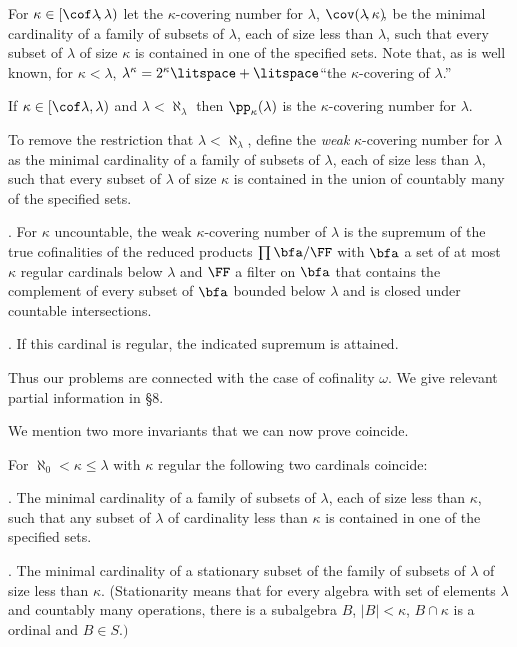 For $\kappa\in[\cof\lambda\!,\lambda)$ let the 
$\kappa$-covering number
for $\lambda$\!, $\cov(\lambda\!, \kappa)\!,$ be the 
minimal cardinality of a family of
 subsets of
$\lambda$, each of size less than $\lambda$, such that 
every subset of
$\lambda$ of size $\kappa$ is contained in one of the 
specified sets.
 Note that, as is well known, for $\kappa<\lambda$,
$\lambda^\kappa=2^\kappa\litspace+\litspace$``the 
$\kappa$-covering of $\lambda$.''
 
 If 
$\kappa\in[\cof\lambda,\lambda)$ and
$\lambda<\aleph_\lambda$ then $\pp_\kappa(\lambda)$ is the
$\kappa$-covering number for $\lambda$.
\endproclaim
 
To remove the restriction that $\lambda<\aleph_\lambda$, 
define the
{\it weak\/} $\kappa$-covering number for $\lambda$ as the 
minimal
cardinality of a family of subsets of $\lambda$,
each of size less than $\lambda$, such that every subset of
$\lambda$ of size $\kappa$ is contained in the union of 
countably many
of the specified sets.
 
. For $\kappa$ uncountable, the weak $\kappa$-covering 
number
of $\lambda$ is the supremum of the true cofinalities of 
the reduced products
$\prod \bfa/\FF$ with $\bfa$ a set of at most $\kappa$ 
regular
cardinals below $\lambda$ and $\FF$ a filter on $\bfa$ 
that contains
the complement of every subset of $\bfa$ bounded below 
$\lambda$ and
is closed under countable intersections.

. If this cardinal is regular, the indicated supremum 
is attained.
\endproclaim
 
Thus our problems are connected with the case of 
cofinality $\omega$.
We give relevant partial information in \S8.
 
We mention
two more invariants that
we can now prove
coincide.
 
For $\aleph_0<\kappa\le \lambda$ with $\kappa$ regular the 
following
two cardinals coincide\RM:

. The minimal cardinality of a family of subsets of 
$\lambda$,
each of size less than $\kappa$, such that any subset of 
$\lambda$ of
cardinality less than $\kappa$ is contained in one of the 
specified
sets.

. The minimal cardinality of a stationary subset of 
the family
of subsets of $\lambda$ of size less than $\kappa$.
\RM(Stationarity means that for every algebra with set of 
elements $\lambda$
and countably many operations, there is a subalgebra $B$,
$|B|<\kappa$, $B\cap \kappa$ is a ordinal and $B\in S.)$
\endproclaim
 
